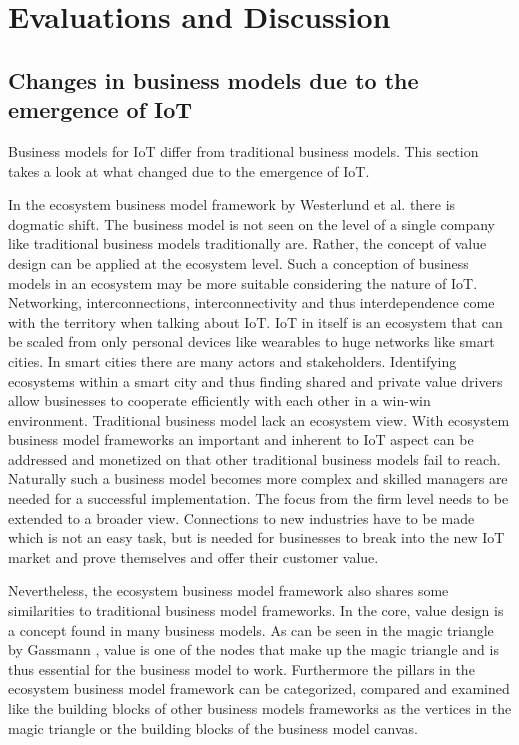 		

\section{Evaluations and Discussion}
	\subsection{Changes in business models due to the emergence of IoT}
\label{sec:eval}

	Business models for IoT differ from traditional business models. This section takes a look at what changed due to the emergence of IoT.

	In the ecosystem business model framework by Westerlund et al. \cite{westerlund} there is dogmatic shift. The business model is not seen on the level of a single company like traditional business models traditionally are. Rather, the concept of value design can be applied at the ecosystem level. Such a conception of business models in an ecosystem may be more suitable considering the nature of IoT. Networking, interconnections, interconnectivity and thus interdependence come with the territory when talking about IoT. IoT in itself is an ecosystem that can be scaled from only personal devices like wearables to huge networks like smart cities. In smart cities there are many actors and stakeholders. Identifying ecosystems within a smart city and thus finding shared and private value drivers allow businesses to cooperate efficiently with each other in a win-win environment. Traditional business model lack an ecosystem view. With ecosystem business model frameworks an important and inherent to IoT aspect can be addressed and monetized on that other traditional business models fail to reach. Naturally such a business model becomes more complex and skilled managers are needed for a successful implementation. The focus from the firm level needs to be extended to a broader view. Connections to new industries have to be made which is not an easy task, but is needed for businesses to break into the new IoT market and prove themselves and offer their customer value.

	Nevertheless, the ecosystem business model framework also shares some similarities to traditional business model frameworks. In the core, value design is a concept found in many business models. As can be seen in the magic triangle by Gassmann \cite{gassmann55}, value is one of the nodes that make up the magic triangle and is thus essential for the business model to work. Furthermore the pillars in the ecosystem business model framework can be categorized, compared and examined like the building blocks of other business models frameworks as the vertices in the magic triangle or the building blocks of the business model canvas.

